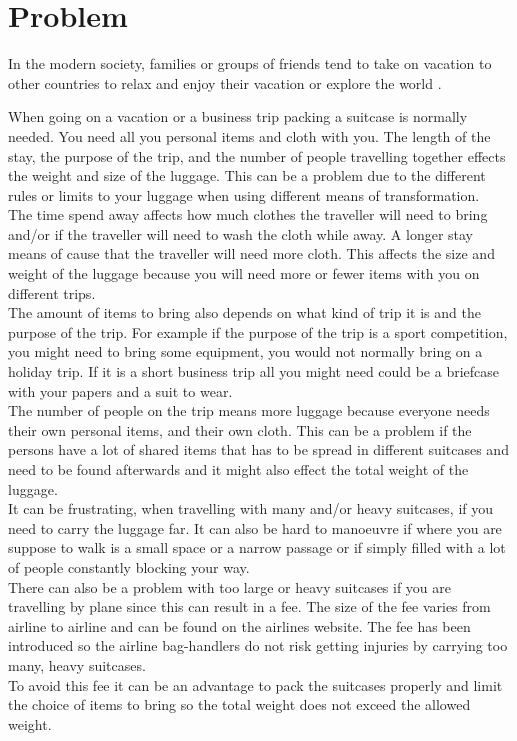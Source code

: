 \section{Problem}
In the modern society, families or groups of friends tend to take on vacation to other countries to relax and enjoy their vacation or explore the world \citep{danskecharter}.

When going on a vacation or a business trip packing a suitcase is normally needed. You need all you personal items and cloth with you. The length of the stay, the purpose of the trip, and the number of people travelling together effects the weight and size of the luggage. This can be a problem due to the different rules or limits to your luggage when using different means of transformation.\\

The time spend away affects how much clothes the traveller will need to bring and/or if the traveller will need to wash the cloth while away. A longer stay means of cause that the traveller will need more cloth. This affects the size and weight of the luggage because you will need more or fewer items with you on different trips.\\
 
The amount of items to bring also depends on what kind of trip it is and the purpose of the trip. For example if the purpose of the trip is a sport competition, you might need to bring some equipment, you would not normally bring on a holiday trip. If it is a short business trip all you might need could be a briefcase with your papers and a suit to wear.\\

The number of people on the trip means more luggage because everyone needs their own personal items, and their own cloth. This can be a problem if the persons have a lot of shared items that has to be spread in different suitcases and need to be found afterwards and it might also effect the total weight of the luggage.\\

It can be frustrating, when travelling with many and/or heavy suitcases, if you need to carry the luggage far. It can also be hard to manoeuvre if where you are suppose to walk is a small space or a narrow passage or if simply filled with a lot of people constantly blocking your way.\\
 
There can also be a problem with too large or heavy suitcases if you are travelling by plane since this can result in a fee. The size of the fee varies from airline to airline and can be found on the airlines website\citep{altombag}. The fee has been introduced so the airline bag-handlers do not risk getting injuries by carrying too many, heavy suitcases.\\ 
To avoid this fee it can be an advantage to pack the suitcases properly and limit the choice of items to bring so the total weight does not exceed the allowed weight.\\

